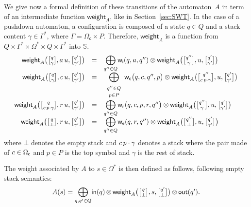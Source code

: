 \documentclass[runningheads]{llncs}
\newcommand{\Semiring}{\mathbb{S}}
\def\weight{\mathsf{weight}}
\def\wei{\mathsf{w}}
\newcommand{\call}[1]{\ensuremath #1} %
\newcommand{\return}[1]{\ensuremath #1} %
\def\Omegac{{\Omega_\mathsf{c}}}
\def\weii{{\wei_\mathsf{i}}}
\def\weic{{\wei_\mathsf{c}}}
\def\weir{{\wei_\mathsf{r}}}
\def\weie{{\wei_\mathsf{e}}}
\newcommand{\config}[2]{\ensuremath \genfrac{[}{]}{0pt}{}{#1}{#2}}
\begin{document}
We give now a formal definition of these transitions of the automaton~$A$
in term of %
an intermediate function $\weight_A$, like in Section~\ref{sec:SWT}.
In the case of a pushdown automaton, a configuration is composed 
of a state $q \in Q$ and a stack content $\gamma \in \Gamma^*$, where $\Gamma = \Omegac \times P$.
Therefore, $\weight_A$ is a function from 
$Q \times \Gamma^* \times \Omega^* \times Q \times \Gamma^*$ into $\Semiring$.
\[
\begin{array}{rcl}
\weight_A\bigl(\config{q}{\gamma}, a\, u, \config{q'}{\gamma'}\bigr) & = & 
 {\displaystyle\bigoplus_{q'' \in Q}} \weii(q, a, q'') 
 \otimes \weight_A\bigl(\config{q''}{\gamma}, u, \config{q'}{\gamma'}\bigr)\\
%
\weight_A\bigl(\config{q}{\gamma}, {\call{c}}\, u, \config{q'}{\gamma'}\bigr) & = & 
 {\displaystyle\bigoplus_{\begin{array}{c}
                          \scriptstyle q'' \in Q\\[-2pt]
                          \scriptstyle p \in P
                          \end{array}}}
 \weic\bigl(q, {\call{c}}, q'', p\bigr) 
 \otimes \weight_A\bigl(\config{q''}{{\call{c}}\, p\cdot \gamma}, u, \config{q'}{\gamma'}\bigr)\\[1mm]
%
\weight_A\bigl(\config{q}{{\call{c}}\, p\cdot \gamma}, {\return{r}}\, u, \config{q'}{\gamma'}\bigr) & = & 
 {\displaystyle\bigoplus_{q'' \in Q}} 
 \weir\bigl(q, {\call{c}}, p, {\return{r}}, q''\bigr) 
 \otimes \weight_A\bigl(\config{q''}{\gamma}, u, \config{q'}{\gamma'}\bigr)\\
%
\weight_A\bigl(\config{q}{\bot}, {\return{r}}\, u, \config{q'}{\gamma'}\bigr) & = & 
 {\displaystyle\bigoplus_{q'' \in Q}} \weie(q, {\return{r}}, q'') 
 \otimes \weight_A\bigl(\config{q''}{\bot}, u, \config{q'}{\gamma'}\bigr)\\
\end{array}
\]
where $\bot$ denotes the empty stack and ${\call{c}}\, p\cdot \gamma$ 
denotes a stack where the pair made of ${\call{c}} \in \Omegac$ and $p \in P$ is the top symbol 
and $\gamma$ is the rest of stack.

\noindent
The weight associated by $A$ to $s \in \Omega^*$
is then defined as follows,
following empty stack semantics: 
\begin{equation}
A(s)  = 
{\displaystyle\bigoplus_{q, q' \in Q}} \textstyle
\mathsf{in}(q) \mathop{\otimes} 
\weight_A\bigl(\config{q}{\bot}, s, \config{q'}{\bot}\bigr) 
\mathop{\otimes} \mathsf{out}(q').
\label{eq:weightA}
\end{equation}
\end{document}
